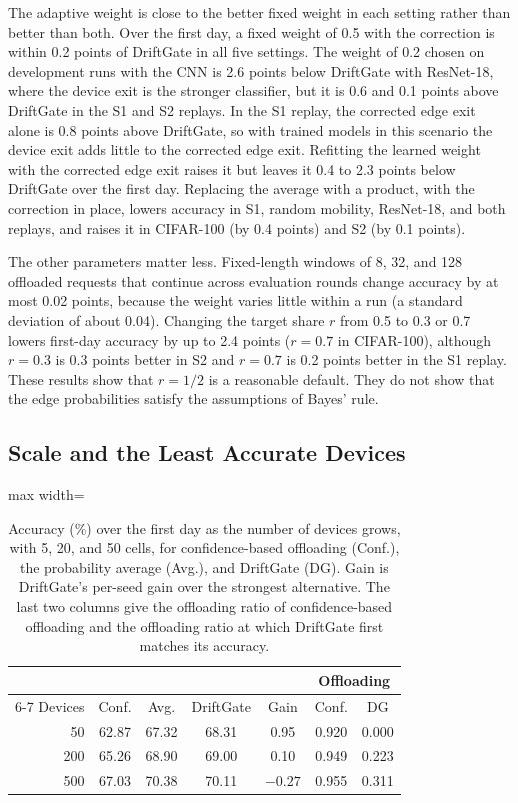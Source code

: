 The adaptive weight is close to the better fixed weight in each setting rather than better than both. Over the first day, a fixed weight of 0.5 with the correction is within 0.2 points of DriftGate in all five settings. The weight of 0.2 chosen on development runs with the CNN is 2.6 points below DriftGate with ResNet-18, where the device exit is the stronger classifier, but it is 0.6 and 0.1 points above DriftGate in the S1 and S2 replays. In the S1 replay, the corrected edge exit alone is 0.8 points above DriftGate, so with trained models in this scenario the device exit adds little to the corrected edge exit. Refitting the learned weight with the corrected edge exit raises it but leaves it 0.4 to 2.3 points below DriftGate over the first day. Replacing the average with a product, with the correction in place, lowers accuracy in S1, random mobility, ResNet-18, and both replays, and raises it in CIFAR-100 (by 0.4 points) and S2 (by 0.1 points).

The other parameters matter less. Fixed-length windows of 8, 32, and 128 offloaded requests that continue across evaluation rounds change accuracy by at most 0.02 points, because the weight varies little within a run (a standard deviation of about 0.04). Changing the target share $r$ from 0.5 to 0.3 or 0.7 lowers first-day accuracy by up to 2.4 points ($r=0.7$ in CIFAR-100), although $r=0.3$ is 0.3 points better in S2 and $r=0.7$ is 0.2 points better in the S1 replay. These results show that $r=1/2$ is a reasonable default. They do not show that the edge probabilities satisfy the assumptions of Bayes' rule.

\subsection{Scale and the Least Accurate Devices}
\label{sec:scale}

\begin{table}[t]
\centering
\caption{Accuracy (\%) over the first day as the number of devices grows, with 5, 20, and 50 cells, for confidence-based offloading (Conf.), the probability average (Avg.), and DriftGate (DG). Gain is DriftGate's per-seed gain over the strongest alternative. The last two columns give the offloading ratio of confidence-based offloading and the offloading ratio at which DriftGate first matches its accuracy.}
\label{tab:scale}
\begin{adjustbox}{max width=\columnwidth}
\begin{tabular}{rcccccc}
\toprule
 & & & & & \multicolumn{2}{c}{Offloading} \\
\cmidrule(lr){6-7}
Devices & Conf. & Avg. & DriftGate & Gain & Conf. & DG \\
\midrule
50 & 62.87 & 67.32 & 68.31 & 0.95 & 0.920 & 0.000 \\
200 & 65.26 & 68.90 & 69.00 & 0.10 & 0.949 & 0.223 \\
500 & 67.03 & 70.38 & 70.11 & $-0.27$ & 0.955 & 0.311 \\
\bottomrule
\end{tabular}
\end{adjustbox}
\end{table}

